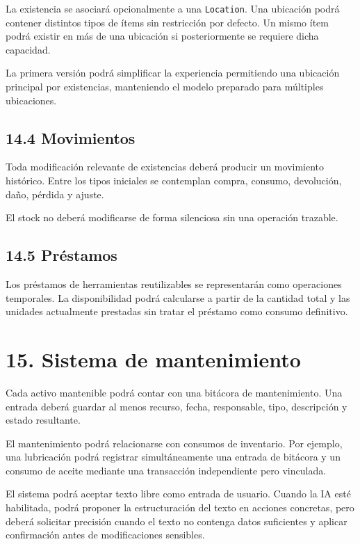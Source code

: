 \documentclass[12pt]{article}
\begin{document}
La existencia se asociará opcionalmente a una \texttt{Location}. Una ubicación podrá contener distintos tipos de ítems sin restricción por defecto. Un mismo ítem podrá existir en más de una ubicación si posteriormente se requiere dicha capacidad.

La primera versión podrá simplificar la experiencia permitiendo una ubicación principal por existencias, manteniendo el modelo preparado para múltiples ubicaciones.

\subsection*{14.4 Movimientos}

Toda modificación relevante de existencias deberá producir un movimiento histórico. Entre los tipos iniciales se contemplan compra, consumo, devolución, daño, pérdida y ajuste.

El stock no deberá modificarse de forma silenciosa sin una operación trazable.

\subsection*{14.5 Préstamos}

Los préstamos de herramientas reutilizables se representarán como operaciones temporales. La disponibilidad podrá calcularse a partir de la cantidad total y las unidades actualmente prestadas sin tratar el préstamo como consumo definitivo.

\section*{15. Sistema de mantenimiento}

Cada activo mantenible podrá contar con una bitácora de mantenimiento. Una entrada deberá guardar al menos recurso, fecha, responsable, tipo, descripción y estado resultante.

El mantenimiento podrá relacionarse con consumos de inventario. Por ejemplo, una lubricación podrá registrar simultáneamente una entrada de bitácora y un consumo de aceite mediante una transacción independiente pero vinculada.

El sistema podrá aceptar texto libre como entrada de usuario. Cuando la IA esté habilitada, podrá proponer la estructuración del texto en acciones concretas, pero deberá solicitar precisión cuando el texto no contenga datos suficientes y aplicar confirmación antes de modificaciones sensibles.
\end{document}
